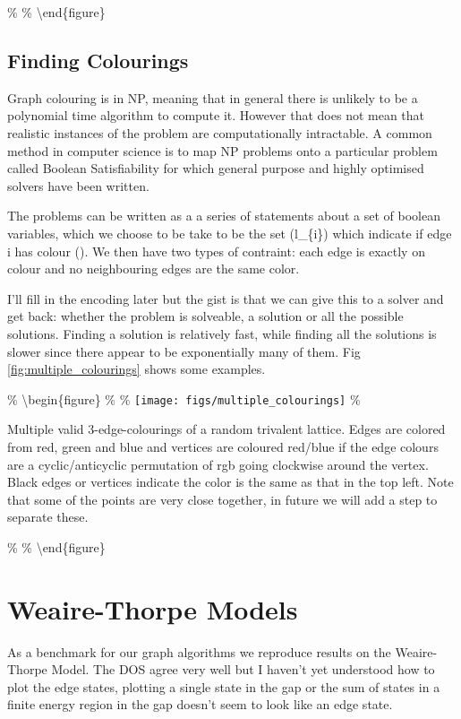 \% \label{fig:edge_color} \% \textbackslash end\{figure\}

\subsection{Finding Colourings}

Graph colouring is in NP, meaning that in general there is unlikely to
be a polynomial time algorithm to compute it. However that does not mean
that realistic instances of the problem are computationally intractable.
A common method in computer science is to map NP problems onto a
particular problem called Boolean Satisfiability for which general
purpose and highly optimised solvers have been written.

The problems can be written as a a series of statements about a set of
boolean variables, which we choose to be take to be the set
(l\_\{i\alpha\}) which indicate if edge i has colour (\alpha). We then
have two types of contraint: each edge is exactly on colour and no
neighbouring edges are the same color.

I'll fill in the encoding later but the gist is that we can give this to
a solver and get back: whether the problem is solveable, a solution or
all the possible solutions. Finding a solution is relatively fast, while
finding all the solutions is slower since there appear to be
exponentially many of them. Fig \ref{fig:multiple_colourings} shows some
examples.

\% \textbackslash begin\{figure\} \% \centering \%
\texttt{[image: figs/multiple\_colourings]} \%

\caption{Multiple valid 3-edge-colourings of a random trivalent lattice. Edges are colored from red, green and blue and vertices are coloured red/blue if the edge colours are a cyclic/anticyclic permutation of rgb going clockwise around the vertex. Black edges or vertices indicate the color is the same as that in the top left. Note that some of the points are very close together, in future we will add a step to separate these.}

\% \label{fig:multiple_colourings} \% \textbackslash end\{figure\}

\section{Weaire-Thorpe Models}

As a benchmark for our graph algorithms we reproduce results on the
Weaire-Thorpe Model. The DOS agree very well but I haven't yet
understood how to plot the edge states, plotting a single state in the
gap or the sum of states in a finite energy region in the gap doesn't
seem to look like an edge state.

